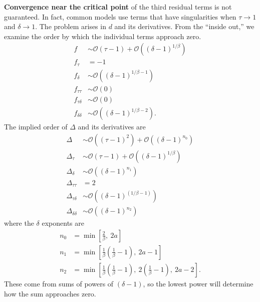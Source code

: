 \textbf{Convergence near the critical point} of the third residual terms is not guaranteed.  In fact, common models use terms that have singularities when $\tau\rightarrow 1$ and $\delta \rightarrow 1$.  The problem arises in $d$ and its derivatives.  From the ``inside out,'' we examine the order by which the individual terms approach zero.
\begin{subequations}
\begin{align}
f &\sim \mathcal{O}\left(\tau-1\right) + \mathcal{O}\left((\delta-1)^{1/\beta}\right)\\
f_{\tau} &= -1\\
f_{\delta} &\sim \mathcal{O}\left((\delta-1)^{1/\beta-1}\right)\\
f_{\tau\tau} &\sim \mathcal{O}(0)\\
f_{\tau\delta} &\sim \mathcal{O}(0)\\
f_{\delta\delta} &\sim \mathcal{O}\left((\delta-1)^{1/\beta-2}\right).
\end{align}
\end{subequations}
The implied order of $\Delta$ and its derivatives are
\begin{subequations}
\begin{align}
\Delta &\sim \mathcal{O}\left((\tau-1)^2\right) + \mathcal{O}\left((\delta-1)^{n_0}\right)\\
\Delta_{\tau} &\sim \mathcal{O}(\tau-1) + \mathcal{O}\left((\delta-1)^{1/\beta}\right)\\
\Delta_{\delta} &\sim \mathcal{O}\left((\delta-1)^{n_1}\right)\\
\Delta_{\tau\tau} &= 2\\
\Delta_{\tau\delta} &\sim \mathcal{O}\left((\delta-1)^{(1/\beta - 1)}\right)\\
\Delta_{\delta\delta} &\sim \mathcal{O}\left((\delta-1)^{n_2}\right)
\end{align}
\end{subequations}
where the $\delta$ exponents are
\begin{subequations}
\begin{align}
n_0 &= \min\left[ \frac{2}{\beta},\ 2a \right]\\
n_1 &= \min\left[ \frac{1}{\beta}\left(\frac{1}{\beta}-1\right),\ 2a-1 \right]\\
n_2 &= \min\left[ \frac{1}{\beta}\left(\frac{1}{\beta}-1\right),\ 2\left(\frac{1}{\beta}-1\right),\ 2a-2 \right].
\end{align}
\end{subequations}
These come from sums of powers of $(\delta-1)$, so the lowest power will determine how the sum approaches zero.

